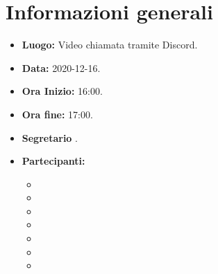 \section{Informazioni generali}
	\begin{itemize}
		\item \textbf{Luogo:} Video chiamata tramite Discord.
		\item \textbf{Data:} 2020-12-16.
		\item \textbf{Ora Inizio:} 16:00.
		\item \textbf{Ora fine:} 17:00.
		\item \textbf{Segretario} \FD.
		\item \textbf{Partecipanti:}
		\begin{itemize}
			\item \MB
			\item \VAS
			\item \FD
			\item \NM
			\item \SB
			\item \GB
			\item \MDI
		\end{itemize}
		
	\end{itemize}